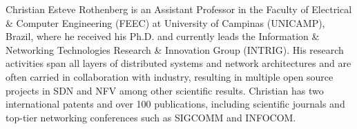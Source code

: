 \documentclass[journal]{IEEEtran}
\begin{document}
\begin{IEEEbiography}{Christian Esteve Rothenberg}
is an Assistant Professor in the Faculty of Electrical \& Computer Engineering (FEEC) at University of Campinas (UNICAMP), Brazil, where he received his Ph.D. and currently leads the Information \& Networking Technologies Research \& Innovation Group (INTRIG). His research activities span all layers of distributed systems and network architectures and are often carried in collaboration with industry, resulting in multiple open source projects in SDN and NFV among other scientific results. Christian has two international patents and over 100  publications, including scientific journals and top-tier networking conferences such as SIGCOMM and INFOCOM.
\\
\end{IEEEbiography}
\end{document}
